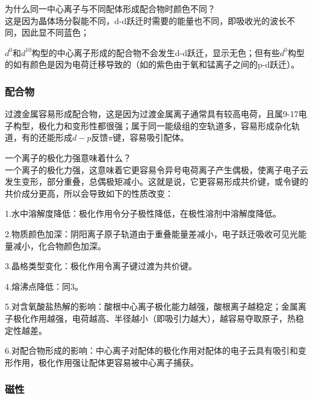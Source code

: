 \documentclass[a4paper,UTF8]{article}
\begin{document}
\begin{tcolorbox}
	
	为什么同一中心离子与不同配体形成配合物时颜色不同？\\

	这是因为晶体场分裂能不同，d-d跃迁时需要的能量也不同，即吸收光的波长不同，因此显不同蓝色；

	$d^0和d^{10}$构型的中心离子形成的配合物不会发生d-d跃迁，显示无色；但有些$d^0$构型的如有颜色是因为电荷迁移导致的（如的紫色由于氧和锰离子之间的p-d跃迁）。

\end{tcolorbox}

\subsubsection{配合物}

过渡金属容易形成配合物，这是因为过渡金属离子通常具有较高电荷，且属9-17电子构型，极化力和变形性都很强；属于同一能级组的空轨道多，容易形成杂化轨道，有的还能形成$d-p反馈\pi 键$，容易吸引配体。

\begin{tcolorbox}
	
	一个离子的极化力强意味着什么？\\

	一个离子的极化力强，这意味着它更容易令异号电荷离子产生偶极，使离子电子云发生变形，部分重叠，总偶极矩减小。这就是说，它更容易形成共价键，或令键的共价成分更高，所以会导致如下的性质改变：

	1.水中溶解度降低：极化作用令分子极性降低，在极性溶剂中溶解度降低。

	2.物质颜色加深：阴阳离子原子轨道由于重叠能量差减小，电子跃迁吸收可见光能量减小，化合物颜色加深。

	3.晶格类型变化：极化作用令离子键过渡为共价键。

	4.熔沸点降低：同3。

	5.对含氧酸盐热解的影响：酸根中心离子极化能力越强，酸根离子越稳定；金属离子极化作用越强，电荷越高、半径越小（即吸引力越大），越容易夺取原子，热稳定性越差。

	6.对配合物形成的影响：中心离子对配体的极化作用对配体的电子云具有吸引和变形作用，极化作用强让配体更容易被中心离子捕获。

\end{tcolorbox}

\subsubsection{磁性}
\end{document}
